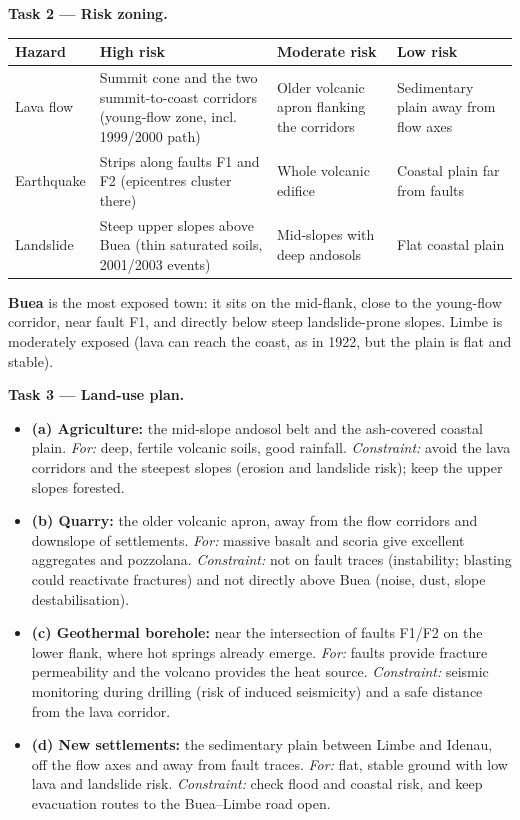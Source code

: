 \documentclass[11pt]{article}
\begin{document}
\textbf{Task 2 — Risk zoning.}

\begin{center}
\begin{tabularx}{\linewidth}{|l|X|X|X|}
\hline
\rowcolor{popblueL} \textbf{Hazard} & \textbf{High risk} & \textbf{Moderate risk} & \textbf{Low risk} \\
\hline
Lava flow & Summit cone and the two summit-to-coast corridors (young-flow zone, incl. 1999/2000 path) & Older volcanic apron flanking the corridors & Sedimentary plain away from flow axes \\
\hline
Earthquake & Strips along faults F1 and F2 (epicentres cluster there) & Whole volcanic edifice & Coastal plain far from faults \\
\hline
Landslide & Steep upper slopes above Buea (thin saturated soils, 2001/2003 events) & Mid-slopes with deep andosols & Flat coastal plain \\
\hline
\end{tabularx}
\end{center}

\textbf{Buea} is the most exposed town: it sits on the mid-flank, close to the young-flow corridor, near fault F1, and directly below steep landslide-prone slopes. Limbe is moderately exposed (lava can reach the coast, as in 1922, but the plain is flat and stable).

\textbf{Task 3 — Land-use plan.}
\begin{itemize}
\item \textbf{(a) Agriculture:} the mid-slope andosol belt and the ash-covered coastal plain. \emph{For:} deep, fertile volcanic soils, good rainfall. \emph{Constraint:} avoid the lava corridors and the steepest slopes (erosion and landslide risk); keep the upper slopes forested.
\item \textbf{(b) Quarry:} the older volcanic apron, away from the flow corridors and downslope of settlements. \emph{For:} massive basalt and scoria give excellent aggregates and pozzolana. \emph{Constraint:} not on fault traces (instability; blasting could reactivate fractures) and not directly above Buea (noise, dust, slope destabilisation).
\item \textbf{(c) Geothermal borehole:} near the intersection of faults F1/F2 on the lower flank, where hot springs already emerge. \emph{For:} faults provide fracture permeability and the volcano provides the heat source. \emph{Constraint:} seismic monitoring during drilling (risk of induced seismicity) and a safe distance from the lava corridor.
\item \textbf{(d) New settlements:} the sedimentary plain between Limbe and Idenau, off the flow axes and away from fault traces. \emph{For:} flat, stable ground with low lava and landslide risk. \emph{Constraint:} check flood and coastal risk, and keep evacuation routes to the Buea--Limbe road open.
\end{itemize}
\end{document}
